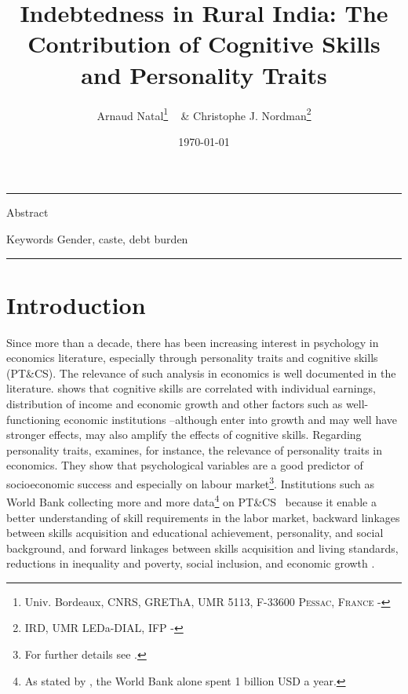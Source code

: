 \documentclass[a4paper, 11pt, onecolumn]{article}
\title{Indebtedness in Rural India: The Contribution of Cognitive Skills and Personality Traits}
\author{Arnaud Natal\thanks{Univ. Bordeaux, CNRS, GREThA, UMR 5113, F-33600 \textsc{Pessac, France} - \email{arnaud.natal@u-bordeaux.fr}} ~ \& Christophe J. Nordman\thanks{IRD, UMR LEDa-DIAL, IFP - \email{nordman@dial.prd}} }
\date{\today}
\newcommand{\PTCS}{PT\&CS}
\begin{document}
\maketitle

\hrule 
\vspace{0.3cm}

\begin{resab}{Abstract}

\end{resab}

\begin{motkey}{Keywords}
Gender, caste, debt burden
\end{motkey}


\hrule

\section{Introduction}
\label{Introduction}

Since more than a decade, there has been increasing interest in psychology in economics literature, especially through personality traits and cognitive skills (\PTCS).
The relevance of such analysis in economics is well documented in the literature.
\cite{Hanushek2008} shows that cognitive skills are correlated with individual earnings, distribution of income and economic growth and other factors such as well-functioning economic institutions --although enter into growth and may well have stronger effects, may also amplify the effects of cognitive skills.
Regarding personality traits, \cite{Borghans2008} examines, for instance, the relevance of personality traits in economics.
They show that psychological variables are a good predictor of socioeconomic success and especially on labour market\footnote{For further details see \cite{Almlund2011}.}. %
Institutions such as World Bank collecting more and more data\footnote{As stated by \cite{Laajaj2019b}, the World Bank alone spent 1 billion USD a year.} on \PTCS~ because it enable a better understanding of skill requirements in the labor market, backward linkages between skills acquisition and educational achievement, personality, and social background, and forward linkages between skills acquisition and living standards, reductions in inequality and poverty, social inclusion, and economic growth \citep{STEP2014}.
\end{document}
